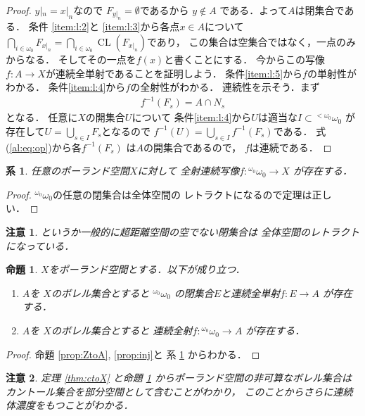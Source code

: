 \documentclass[leqno, 12pt]{jsarticle}
\newtheorem{prop}[thm]{命題}
\newtheorem{cor}[thm]{系}
\newtheorem*{rmk}{注意}
\DeclareMathOperator{\cl}{CL}
\newcommand{\myomega}{\omega_{0}}
\newcommand{\mybairetb}{{}^{<\myomega}\myomega}
\newcommand{\mybaire}{{}^{\myomega}\myomega}
\newcommand{\mynbd}[1]{N_{#1}}
\begin{document}
\begin{proof}
$y|_{n}=x|_{n}$なので
$F_{y|_{n}}=\emptyset$であるから
$y\not\in A$
である．よって$A$は閉集合である．
条件
\ref{item:l:2}と
\ref{item:l:3}から各点$x\in A$について
$\bigcap_{i\in \myomega}F_{x|_{n}}
=\bigcap_{i\in \myomega}\cl(F_{x|_{n}})$であり，
この集合は空集合ではなく，一点のみからなる．
そしてその一点を$f(x)$と書くことにする．
今からこの写像$f\colon A\to X$が連続全単射であることを証明しよう．
条件\ref{item:l:5}から$f$の単射性がわかる．
条件\ref{item:l:4}から$f$の全射性がわかる．
連続性を示そう．まず
\begin{align}\label{al:eq:op}
f^{-1}(F_{s})=A\cap \mynbd{s}
\end{align}
となる．
任意に$X$の開集合$U$について
条件\ref{item:l:4}から$U$は適当な$I\subset \mybairetb$
が存在して$U=\bigcup_{s\in I}F_{s}$となるので
$f^{-1}(U)=\bigcup_{s\in I}f^{-1}(F_{s})$である．
式(\ref{al:eq:op})から各$f^{-1}(F_{s})$
は$A$の開集合であるので，
$f$は連続である．
\end{proof}





\begin{cor}\label{cor:sur}
任意のポーランド空間$X$に対して
全射連続写像$f\colon \mybaire\to X$
が存在する．
\end{cor}
\begin{proof}
$\mybaire$の任意の閉集合は全体空間の
レトラクトになるので定理は正しい．
\end{proof}
\begin{rmk}
というか一般的に超距離空間の空でない閉集合は
全体空間のレトラクトになっている．

\end{rmk}


\begin{prop}\label{prop:ppp}
$X$をポーランド空間とする．以下が成り立つ．
\begin{enumerate}
\item 
$A$を
$X$のボレル集合とすると
$\mybaire$
の閉集合$E$と連続全単射$f\colon E\to A$
が存在する．
\item 
$A$を
$X$のボレル集合とすると
連続全射$f\colon \mybaire\to A$
が存在する．

\end{enumerate}
\end{prop}
\begin{proof}
命題 
\ref{prop:ZtoA}, 
\ref{prop:inj}と
系 \ref{cor:sur}
からわかる．
\end{proof}

\begin{rmk}
定理 \ref{thm:ctoX}
と命題 \ref{prop:ppp}
からポーランド空間の非可算なボレル集合は
カントール集合を部分空間として含むことがわかり，
このことからさらに連続体濃度をもつことがわかる．
\end{rmk}
\end{document}
